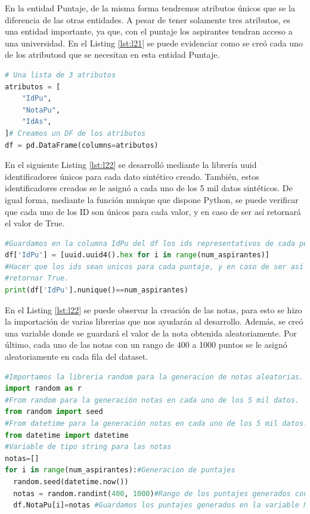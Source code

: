 \documentclass[10pt, oneside,spanish]{article}   	%
\begin{document}
En la entidad Puntaje, de la misma forma tendremos atributos únicos que se la diferencia de las otras entidades. A pesar de tener solamente tres atributos, es una entidad importante, ya que, con el puntaje los aspirantes tendran acceso a una universidad. En el Listing \ref{lst:l21} se puede evidenciar como se creó cada uno de los atributosd que se necesitan en esta entidad Puntaje.
\begin{lstlisting}[language=Python,label={lst:l21},caption=Lista de atributos para la entidad Permisos,frame=single, ]
# Una lista de 3 atributos
atributos = [
    "IdPu",
    "NotaPu",
    "IdAs",
]# Creamos un DF de los atributos
df = pd.DataFrame(columns=atributos)
\end{lstlisting}
En el siguiente Listing \ref{lst:l22} se desarrolló mediante la librería uuid identificadores únicos para cada dato sintético creado. También, estos identificadores creados se le asignó a cada uno de los 5 mil datos sintéticos. De igual forma, mediante la función nunique que dispone Python, se puede verificar que cada uno de los ID son únicos para cada valor, y en caso de ser así retornará el valor de True.
\begin{lstlisting}[language=Python,label={lst:l22},caption=Atributo IdPu para la variable puntaje,frame=single, ]
#Guardamos en la columna IdPu del df los ids representativos de cada puntaje.
df['IdPu'] = [uuid.uuid4().hex for i in range(num_aspirantes)]
#Hacer que los ids sean unicos para cada puntaje, y en caso de ser así 
#retornar True.
print(df['IdPu'].nunique()==num_aspirantes)
\end{lstlisting}

En el Listing \ref{lst:l22} se puede observar la creación de las notas, para esto se hizo la importación de varias librerias que nos ayudarán al desarrollo. Además, se creó una variable donde se guardará el valor de la nota obtenida aleatoriamente. Por último, cada uno de las notas con un rango de 400 a 1000 puntos se le asignó aleatoriamente en cada fila del dataset.
\begin{lstlisting}[language=Python,label={lst:l23},caption=Atributo NotasPu para la variable puntaje,frame=single, ]
#Importamos la libreria random para la generacion de notas aleatorias.
import random as r
#From random para la generación notas en cada uno de los 5 mil datos.
from random import seed
#From datetime para la generación notas en cada uno de los 5 mil datos.
from datetime import datetime
#Variable de tipo string para las notas
notas=[]
for i in range(num_aspirantes):#Generacion de puntajes 
  random.seed(datetime.now())
  notas = random.randint(400, 1000)#Rango de los puntajes generados con un limite de 400 a 1000
  df.NotaPu[i]=notas #Guardamos los puntajes generados en la variable NotasPu
\end{lstlisting}
\end{document}
